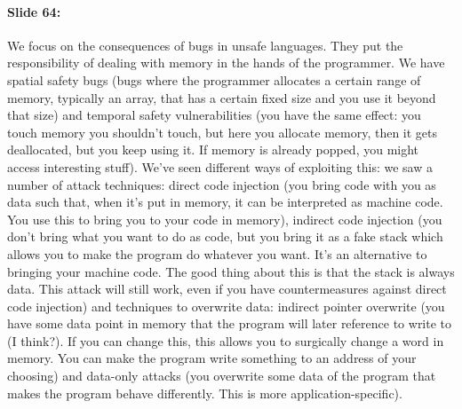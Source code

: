 \documentclass[10pt,a4paper]{report}
\begin{document}
\paragraph{Slide 64:} We focus on the consequences of bugs in unsafe languages. They put the responsibility of dealing with memory in the hands of the programmer. We have spatial safety bugs (bugs where the programmer allocates a certain range of memory, typically an array, that has a certain fixed size and you use it beyond that size) and temporal safety vulnerabilities (you have the same effect: you touch memory you shouldn't touch, but here you allocate memory, then it gets deallocated, but you keep using it. If memory is already popped, you might access interesting stuff). We've seen different ways of exploiting this: we saw a number of attack techniques: direct code injection (you bring code with you as data such that, when it's put in memory, it can be interpreted as machine code. You use this to bring you to your code in memory), indirect code injection (you don't bring what you want to do as code, but you bring it as a fake stack which allows you to make the program do whatever you want. It's an alternative to bringing your machine code. The good thing about this is that the stack is always data. This attack will still work, even if you have countermeasures against direct code injection) and techniques to overwrite data: indirect pointer overwrite (you have some data point in memory that the program will later reference to write to (I think?). If you can change this, this allows you to surgically change a word in memory. You can make the program write something to an address of your choosing) and data-only attacks (you overwrite some data of the program that makes the program behave differently. This is more application-specific).\\
\end{document}
